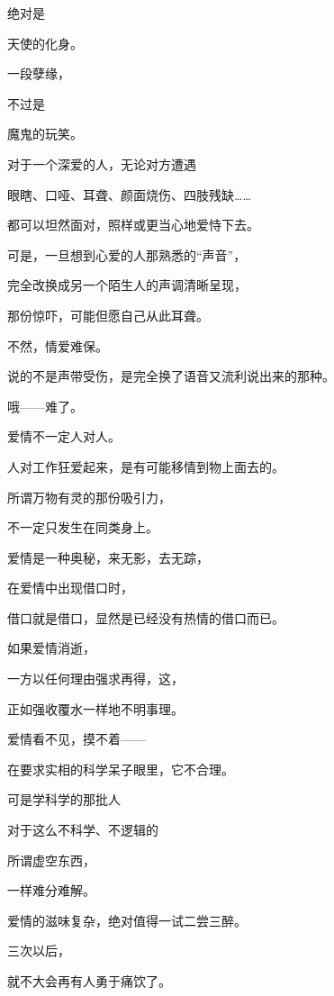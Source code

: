 \par 绝对是
\par 天使的化身。
\par 一段孽缘，
\par 不过是
\par 魔鬼的玩笑。
\par 
\par 对于一个深爱的人，无论对方遭遇
\par 眼瞎、口哑、耳聋、颜面烧伤、四肢残缺……
\par 都可以坦然面对，照样或更当心地爱恃下去。
\par 可是，一旦想到心爱的人那熟悉的“声音”，
\par 
\par 完全改换成另一个陌生人的声调清晰呈现，
\par 那份惊吓，可能但愿自己从此耳聋。
\par 不然，情爱难保。
\par 说的不是声带受伤，是完全换了语音又流利说出来的那种。
\par 哦——难了。
\par 
\par 爱情不一定人对人。
\par 人对工作狂爱起来，是有可能移情到物上面去的。
\par 所谓万物有灵的那份吸引力，
\par 不一定只发生在同类身上。
\par 
\par 爱情是一种奥秘，来无影，去无踪，
\par 在爱情中出现借口时，
\par 借口就是借口，显然是已经没有热情的借口而已。
\par 如果爱情消逝，
\par 一方以任何理由强求再得，这，
\par 正如强收覆水一样地不明事理。
\par 
\par 爱情看不见，摸不着——
\par 在要求实相的科学呆子眼里，它不合理。
\par 可是学科学的那批人
\par 对于这么不科学、不逻辑的
\par 所谓虚空东西，
\par 一样难分难解。
\par 
\par 爱情的滋味复杂，绝对值得一试二尝三醉。
\par 三次以后，
\par 就不大会再有人勇于痛饮了。
